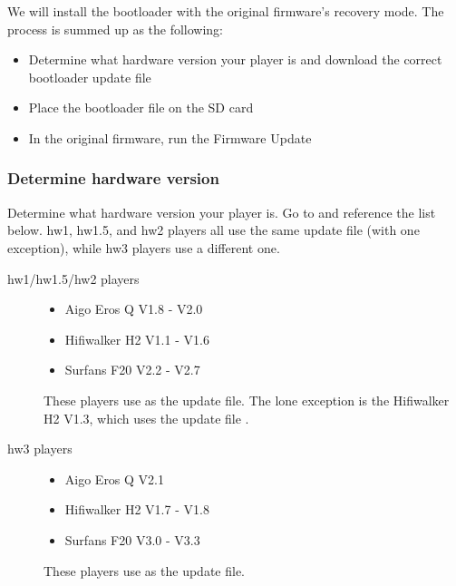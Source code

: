 We will install the bootloader with the original firmware's recovery
mode. The process is summed up as the following:

\begin{itemize}
  \item Determine what hardware version your player is and download
    the correct bootloader update file
  \item Place the bootloader  file on the SD card
  \item In the original firmware, run the Firmware Update
\end{itemize}

\subsubsection{Determine hardware version}\label{ref:determine_hardware_version}
Determine what hardware version your player is. Go to
 and reference
the list below. hw1, hw1.5, and hw2 players all use the same update
file (with one exception), while hw3 players use a different one.


\begin{description}
\item[hw1/hw1.5/hw2 players]
  \begin{itemize}
    \item Aigo Eros Q V1.8 - V2.0
    \item Hifiwalker H2 V1.1 - V1.6
    \item Surfans F20 V2.2 - V2.7
  \end{itemize}

  These players use  as the update file.
  The lone exception is the Hifiwalker H2 V1.3, which uses the update file
  .
\item[hw3 players]
  \begin{itemize}
    \item Aigo Eros Q V2.1
    \item Hifiwalker H2 V1.7 - V1.8
    \item Surfans F20 V3.0 - V3.3
  \end{itemize}

  These players use  as the update file.
\end{description}

